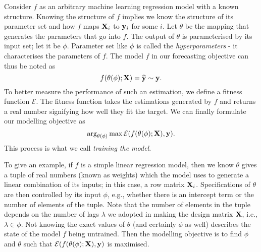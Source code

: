 Consider $f$ as an arbitrary machine learning regression model with a known structure. Knowing the structure of $f$ implies we know the structure of its parameter set and how $f$ maps $\mathbf{X}_i$ to $\mathbf{y}_i$ for some $i$. Let $\theta$ be the mapping that generates the parameters that go into $f$. The output of $\theta$ is parameterised by its input set; let it be $\phi$. Parameter set like $\phi$ is called the \textit{hyperparameters} - it characterises the parameters of $f$. The model $f$ in our forecasting objective can thus be noted as
\begin{equation}\label{eq: estimate}
    f(\theta(\phi); \mathbf{X}) = \widehat{\mathbf{y}} \sim \mathbf{y}.
\end{equation}
To better measure the performance of such an estimation, we define a fitness function $\mathcal{E}$. The fitness function takes the estimations generated by $f$ and returns a real number signifying how well they fit the target. We can finally formulate our modelling objective as
\begin{equation}
    \arg_{\theta(\phi)} \max \mathcal{E}(f(\theta(\phi); \mathbf{X}), \mathbf{y}).
\end{equation}
This process is what we call \textit{training the model}.

To give an example, if $f$ is a simple linear regression model, then we know $\theta$ gives a tuple of real numbers (known as weights) which the model uses to generate a linear combination of its inputs; in this case, a row matrix $\mathbf{X}_i$. Specifications of $\theta$ are then controlled by its input $\phi$, e.g., whether there is an intercept term or the number of elements of the tuple. Note that the number of elements in the tuple depends on the number of lags $\lambda$ we adopted in making the design matrix $\mathbf{X}$, i.e., $\lambda \in \phi$. Not knowing the exact values of $\theta$ (and certainly $\phi$ as well) describes the state of the model $f$ being untrained. Then the modelling objective is to find $\phi$ and $\theta$ such that $\mathcal{E}(f(\theta(\phi); \mathbf{X}), \mathbf{y})$ is maximised.

